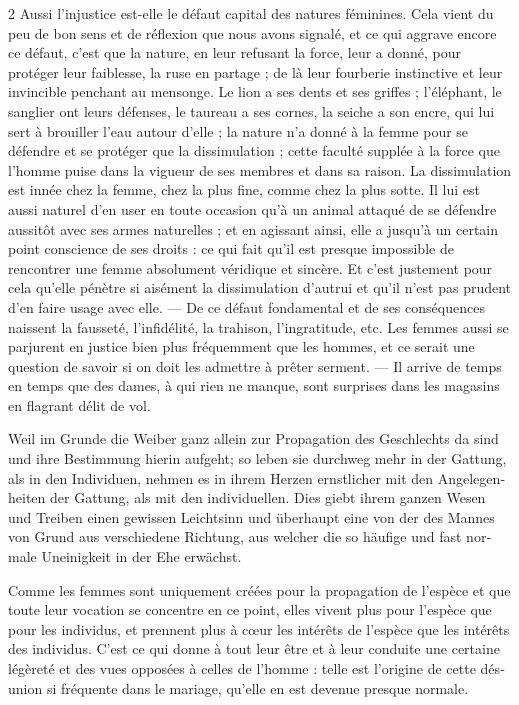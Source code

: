 \documentclass[a4paper,12pt]{article}
\newcommand\chunks[2]{%
\begin{leftcolumn*}\begin{otherlanguage}{german}%
{#1}%
\end{otherlanguage}\end{leftcolumn*}%
\begin{rightcolumn}\begin{otherlanguage}{french}%
{#2}%
\end{otherlanguage}\end{rightcolumn}%
}
\begin{document}
\begin{paracol}{2}
         {Aussi l’injustice est-elle le défaut capital des natures féminines. Cela vient du peu de bon sens et de réflexion que nous avons signalé, et ce qui aggrave encore ce défaut, c’est que la nature, en leur refusant la force, leur a donné, pour protéger leur faiblesse, la ruse en partage ; de là leur fourberie instinctive et leur invincible penchant au mensonge. Le lion a ses dents et ses griffes ; l’éléphant, le sanglier ont leurs défenses, le taureau a ses cornes, la seiche a son encre, qui lui sert à brouiller l’eau autour d’elle ; la nature n’a donné à la femme pour se défendre et se protéger que la dissimulation ; cette faculté supplée à la force que l’homme puise dans la vigueur de ses membres et dans sa raison. La dissimulation est innée chez la femme, chez la plus fine, comme chez la plus sotte. Il lui est aussi naturel d’en user en toute occasion qu’à un animal attaqué de se défendre aussitôt avec ses armes naturelles ; et en agissant ainsi, elle a jusqu’à un certain point conscience de ses droits : ce qui fait qu’il est presque impossible de rencontrer une femme absolument véridique et sincère. Et c’est justement pour cela qu’elle pénètre si aisément la dissimulation d’autrui et qu’il n’est pas prudent d’en faire usage avec elle. --- De ce défaut fondamental et de ses conséquences naissent la fausseté, l’infidélité, la trahison, l’ingratitude, etc. Les femmes aussi se parjurent en justice bien plus fréquemment que les hommes, et ce serait une question de savoir si on doit les admettre à prêter serment. --- Il arrive de temps en temps que des dames, à qui rien ne manque, sont surprises dans les magasins en flagrant délit de vol.}
  \chunks{\textelp{}}
         {\textelp{}}
  \chunks{Weil im Grunde die Weiber ganz allein zur Propagation des Geschlechts da sind und ihre Bestimmung hierin aufgeht; so leben sie durchweg mehr in der Gattung, als in den Individuen, nehmen es in ihrem Herzen ernstlicher mit den Angelegenheiten der Gattung, als mit den individuellen. Dies giebt ihrem ganzen Wesen und Treiben einen gewissen Leichtsinn und überhaupt eine von der des Mannes von Grund aus verschiedene Richtung, aus welcher die so häufige und fast normale Uneinigkeit in der Ehe erwächst.}
         {Comme les femmes sont uniquement créées pour la propagation de l’espèce et que toute leur vocation se concentre en ce point, elles vivent plus pour l’espèce que pour les individus, et prennent plus à cœur les intérêts de l’espèce que les intérêts des individus. C’est ce qui donne à tout leur être et à leur conduite une certaine légèreté et des vues opposées à celles de l’homme : telle est l’origine de cette désunion si fréquente dans le mariage, qu’elle en est devenue presque normale.}

\end{paracol}
\end{document}
